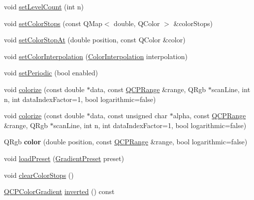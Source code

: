 \begin{DoxyCompactItemize}
\item 
void \hyperlink{classQCPColorGradient_a18da587eb4f7fc788ea28ba15b6a12de}{set\+Level\+Count} (int n)
\item 
void \hyperlink{classQCPColorGradient_a724e828aa6f0ba5011a9392477c35d3a}{set\+Color\+Stops} (const Q\+Map$<$ double, Q\+Color $>$ \&color\+Stops)
\item 
void \hyperlink{classQCPColorGradient_a3b48be5e78079db1bb2a1188a4c3390e}{set\+Color\+Stop\+At} (double position, const Q\+Color \&color)
\item 
void \hyperlink{classQCPColorGradient_aa13fda86406e1d896a465a409ae63b38}{set\+Color\+Interpolation} (\hyperlink{classQCPColorGradient_ac5dca17cc24336e6ca176610e7f77fc1}{Color\+Interpolation} interpolation)
\item 
void \hyperlink{classQCPColorGradient_a39d6448155fc00a219f239220d14bb39}{set\+Periodic} (bool enabled)
\item 
void \hyperlink{classQCPColorGradient_aaf423ceb943e177b0ed2c48c811d83dc}{colorize} (const double $\ast$data, const \hyperlink{classQCPRange}{Q\+C\+P\+Range} \&range, Q\+Rgb $\ast$scan\+Line, int n, int data\+Index\+Factor=1, bool logarithmic=false)
\item 
void \hyperlink{classQCPColorGradient_acf0cc7fba83ef21f7b8d5d5258519db3}{colorize} (const double $\ast$data, const unsigned char $\ast$alpha, const \hyperlink{classQCPRange}{Q\+C\+P\+Range} \&range, Q\+Rgb $\ast$scan\+Line, int n, int data\+Index\+Factor=1, bool logarithmic=false)
\item 
Q\+Rgb {\bfseries color} (double position, const \hyperlink{classQCPRange}{Q\+C\+P\+Range} \&range, bool logarithmic=false)\hypertarget{classQCPColorGradient_a0599545c859268b025d2060dea741cea}{}\label{classQCPColorGradient_a0599545c859268b025d2060dea741cea}

\item 
void \hyperlink{classQCPColorGradient_aa0aeec1528241728b9671bf8e60b1622}{load\+Preset} (\hyperlink{classQCPColorGradient_aed6569828fee337023670272910c9072}{Gradient\+Preset} preset)
\item 
void \hyperlink{classQCPColorGradient_a939213e85f0d1279519d555c5fcfb6ad}{clear\+Color\+Stops} ()
\item 
\hyperlink{classQCPColorGradient}{Q\+C\+P\+Color\+Gradient} \hyperlink{classQCPColorGradient_abe04e1d1ccab3d7aa78f2924faed4916}{inverted} () const 
\end{DoxyCompactItemize}
